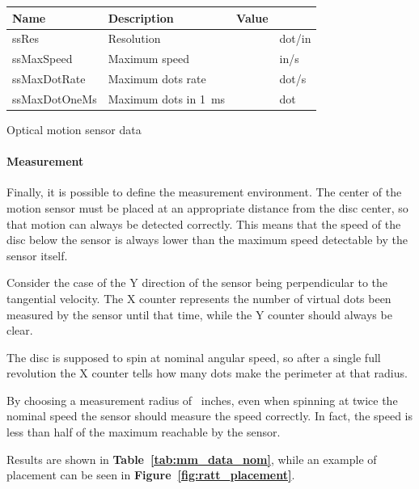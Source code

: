 \documentclass[a4paper,10pt]{article}
\makeatletter
\newenvironment{tablehere}{\def\@captype{table}\vspace{2ex}}{\vspace{2ex}}
\newcommand{\citef}[1]{\textbf{Figure~\ref{#1}}}
\newcommand{\citet}[1]{\textbf{Table~\ref{#1}}}
\makeatother
\begin{document}
\begin{multicols}{2}
\begin{tablehere}
\centering \footnotesize
\begin{tabular}{|l|l|rl|}
\hline
\textbf{Name} & \textbf{Description} & \textbf{Value} &	\\
\hline
ssRes			& Resolution			& \ssRes			& dot/in		\		& Maximum speed			& \ssMaxSpeed		& in/s			\\
\hline	
ssMaxDotRate	& Maximum dots rate		& \ssMaxDotRate		& dot/s			\\
ssMaxDotOneMs	& Maximum dots in 1~ms	& \ssMaxDotsOneMs	& dot			\\
\hline
\end{tabular}
\caption{Optical motion sensor data}
\label{tab:ss_data}
\end{tablehere}


\paragraph{Measurement}
Finally, it is possible to define the measurement environment. The center of
the motion sensor must be placed at an appropriate distance from the disc
center, so that motion can always be detected correctly. This means that the
speed of the disc below the sensor is always lower than the maximum speed
detectable by the sensor itself.

Consider the case of the Y direction of the sensor being perpendicular to the
tangential velocity. The X counter represents the number of virtual dots been
measured by the sensor until that time, while the Y counter should always be
clear.

The disc is supposed to spin at nominal angular speed, so after a single full
revolution the X counter tells how many dots make the perimeter at that
radius.

By choosing a measurement radius of \mmRadius\  inches, even when spinning at
twice the nominal speed the sensor should measure the speed correctly. In
fact, the speed is less than half of the maximum reachable by the sensor.

Results are shown in \citet{tab:mm_data_nom}, while an example of placement
can be seen in \citef{fig:ratt_placement}.


\end{multicols}
\end{document}
